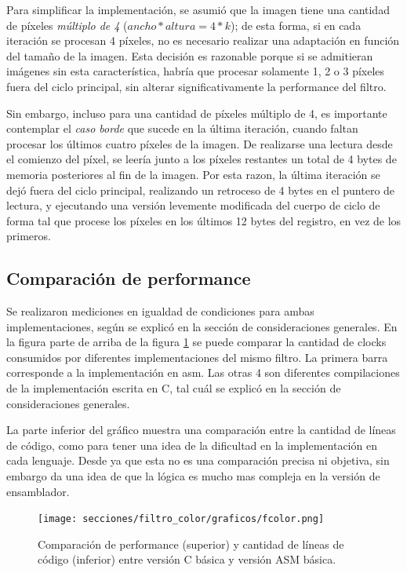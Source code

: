 Para simplificar la implementación, se asumió que la imagen tiene una cantidad de píxeles \emph{múltiplo de 4} ($ancho * altura = 4 * k$); de esta forma, si en cada iteración se procesan 4 píxeles, no es necesario realizar una adaptación en función del tamaño de la imagen. Esta decisión es razonable porque si se admitieran imágenes sin esta característica, habría que procesar solamente 1, 2 o 3 píxeles fuera del ciclo principal, sin alterar significativamente la performance del filtro.

Sin embargo, incluso para una cantidad de píxeles múltiplo de 4, es importante contemplar el \emph{caso borde} que sucede en la última iteración, cuando faltan procesar los últimos cuatro píxeles de la imagen. De realizarse una lectura desde el comienzo del píxel, se leería junto a los píxeles restantes un total de 4 bytes de memoria posteriores al fin de la imagen. Por esta razon, la última iteración se dejó fuera del ciclo principal, realizando un retroceso de 4 bytes en el puntero de lectura, y ejecutando una versión levemente modificada del cuerpo de ciclo de forma tal que procese los píxeles en los últimos 12 bytes del registro, en vez de los primeros.

\subsection{Comparación de performance}
\label{sub:comparaci_n_de_performance_fcolor}

	Se realizaron mediciones en igualdad de condiciones para ambas implementaciones,
según se explicó en la sección de consideraciones generales. En la figura parte de arriba
de la figura \ref{fig:filtro-color-C-vs-ASM} se puede comparar la cantidad de clocks 
consumidos por diferentes implementaciones del mismo filtro.
	La primera barra corresponde a la implementación en asm. Las otras 4 son diferentes
compilaciones de la implementación escrita en C, tal cuál se explicó en la sección de
consideraciones generales.
	
	La parte inferior del gráfico muestra una comparación entre la cantidad de líneas
de código, como para tener una idea de la dificultad en la implementación en cada
lenguaje. Desde ya que esta no es una comparación precisa ni objetiva, sin embargo da una
idea de que la lógica es mucho mas compleja en la versión de ensamblador.




\begin{figure}[H]
\begin{center}
  \texttt{[image: secciones/filtro\_color/graficos/fcolor.png]}
\end{center}
\caption{Comparación de performance (superior) y cantidad de líneas de código (inferior) entre versión C básica y versión ASM básica.}
\label{fig:filtro-color-C-vs-ASM}
\end{figure}

